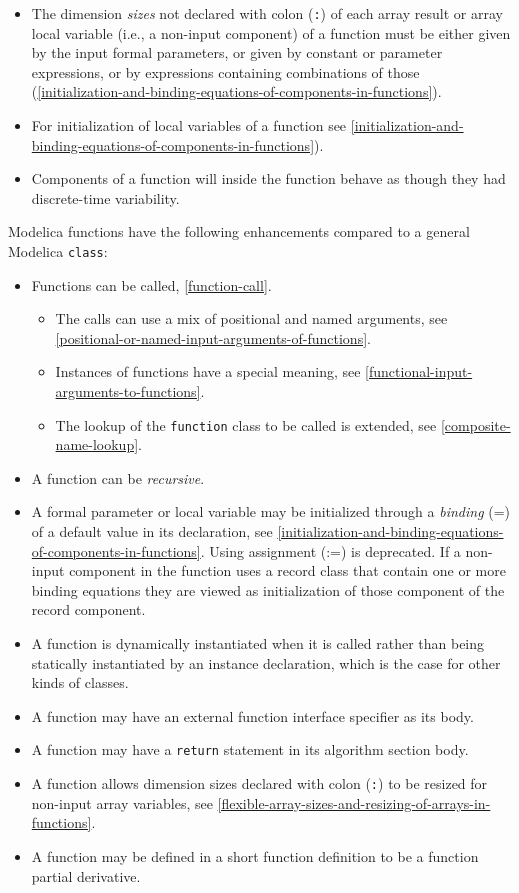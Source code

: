 \begin{itemize}
\item
  The dimension \emph{sizes} not declared with colon (\lstinline!:!) of each array result or array local variable (i.e., a non-input component) of a function must be either given by the input formal parameters, or given by constant or parameter expressions, or by expressions containing combinations of those (\cref{initialization-and-binding-equations-of-components-in-functions}).
\item
  For initialization of local variables of a function see \cref{initialization-and-binding-equations-of-components-in-functions}).
\item
  Components of a function will inside the function behave as though
  they had discrete-time variability.
\end{itemize}

Modelica functions have the following enhancements compared to a general
Modelica \lstinline!class!:
\begin{itemize}
\item
  Functions can be called, \cref{function-call}.

  \begin{itemize}
  \item
    The calls can use a mix of positional and named arguments, see
    \cref{positional-or-named-input-arguments-of-functions}.
  \item
    Instances of functions have a special meaning, see \cref{functional-input-arguments-to-functions}.
  \item
    The lookup of the \lstinline!function! class to be called is extended, see \cref{composite-name-lookup}.
  \end{itemize}
\item
  A function can be \emph{recursive}.
\item
  A formal parameter or local variable may be initialized through a
  \emph{binding} (=) of a default value in its declaration,
  see \cref{initialization-and-binding-equations-of-components-in-functions}.
  Using assignment (:=) is deprecated. If a non-input component in the
  function uses a record class that contain one or more binding
  equations they are viewed as initialization of those component of the
  record component.
\item
  A function is dynamically instantiated when it is called rather than
  being statically instantiated by an instance declaration, which is the
  case for other kinds of classes.
\item
  A function may have an external function interface specifier as its
  body.
\item
  A function may have a \lstinline!return! statement in its algorithm section body.
\item
  A function allows dimension sizes declared with colon (\lstinline!:!) to be resized for non-input array variables, see \cref{flexible-array-sizes-and-resizing-of-arrays-in-functions}.
\item
  A function may be defined in a short function definition to be a
  function partial derivative.
\end{itemize}


